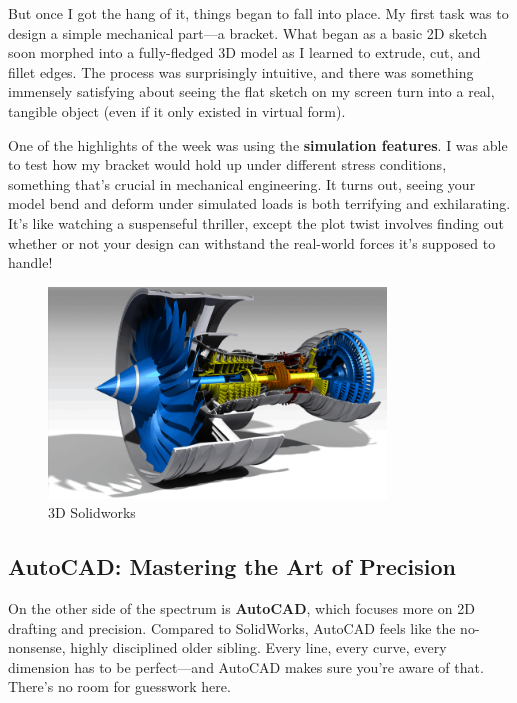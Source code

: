 \documentclass[a4paper]{article} 	%
\begin{document}
But once I got the hang of it, things began to fall into place. My first task was to design a simple mechanical part—a bracket. What began as a basic 2D sketch soon morphed into a fully-fledged 3D model as I learned to extrude, cut, and fillet edges. The process was surprisingly intuitive, and there was something immensely satisfying about seeing the flat sketch on my screen turn into a real, tangible object (even if it only existed in virtual form).

One of the highlights of the week was using the \textbf{simulation features}. I was able to test how my bracket would hold up under different stress conditions, something that’s crucial in mechanical engineering. It turns out, seeing your model bend and deform under simulated loads is both terrifying and exhilarating. It’s like watching a suspenseful thriller, except the plot twist involves finding out whether or not your design can withstand the real-world forces it’s supposed to handle!

\begin{figure}[h!]
	\centering
	\includegraphics[width=0.8\textwidth]{fig007.png}  %
	\caption{3D Solidworks}
	\label{fig:007}
\end{figure}

\subsection*{AutoCAD: Mastering the Art of Precision}

On the other side of the spectrum is \textbf{AutoCAD}, which focuses more on 2D drafting and precision. Compared to SolidWorks, AutoCAD feels like the no-nonsense, highly disciplined older sibling. Every line, every curve, every dimension has to be perfect—and AutoCAD makes sure you’re aware of that. There’s no room for guesswork here.
\end{document}
